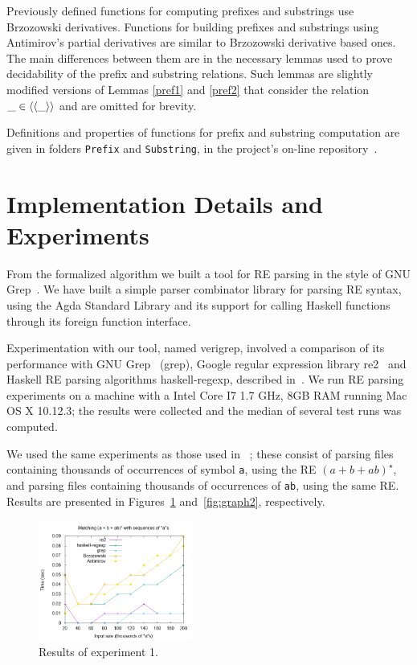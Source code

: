 \documentclass[fleqn,10pt]{SelfArx} %
\theoremstyle{definition}
\newcommand{\D}[1]{\blue{\mathsf{#1}}}
\begin{document}
Previously defined functions for computing prefixes and substrings use Brzozowski
derivatives. Functions for building prefixes and substrings using Antimirov's
partial derivatives are similar to Brzozowski derivative based ones.
The main differences between them are in the necessary lemmas used to prove
decidability of the prefix and substring relations. Such lemmas are slightly modified
versions of Lemmas \ref{pref1} and \ref{pref2} that consider the relation
\ensuremath{\D{\_\in\langle\langle\_\rangle\rangle}}  and are omitted for brevity.

Definitions and properties of functions for prefix and substring computation
are given in folders \texttt{Prefix} and \texttt{Substring}, in the project's on-line
repository~\cite{regex-rep}.

\section{Implementation Details and Experiments}\label{sec:exp}

From the formalized algorithm we built a tool for RE parsing in the
style of GNU Grep~\cite{Grep}. We have built a simple parser
combinator library for parsing RE syntax, using the Agda Standard
Library and its support for calling Haskell functions through its
foreign function interface.

Experimentation with our tool, named verigrep, involved a comparison
of its performance with GNU Grep~\cite{Grep} (grep), Google regular
expression library re2~\cite{re2} and Haskell RE parsing algorithms
haskell-regexp, described in~\cite{Fischer2010}. We run RE parsing
experiments on a machine with a Intel Core I7 1.7 GHz, 8GB RAM running
Mac OS X 10.12.3; the results were collected and the median of several
test runs was computed.

We used the same experiments as those used in ~\cite{SulzmannL14};
these consist of parsing files containing thousands of occurrences of
symbol \texttt{a}, using the RE $(a + b + ab)^\star$, and parsing
files containing thousands of occurrences of \texttt{ab}, using the
same RE. Results are presented in Figures~\ref{fig:graph1}
and~\ref{fig:graph2}, respectively.

\begin{figure}[!ht]
    \includegraphics[width=0.45\textwidth]{as.png}
   \centering
   \caption{Results of experiment 1.}
   \label{fig:graph1}
\end{figure}
\end{document}
